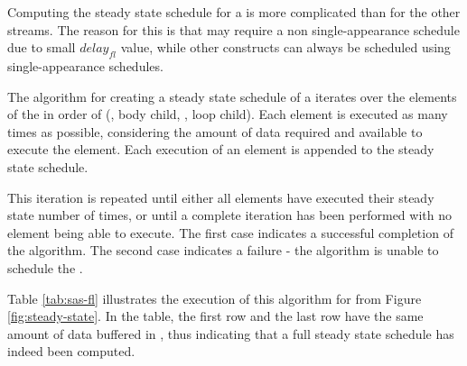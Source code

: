 \begin{comment}
\begin{displaymath}
\begin{array}{rl}
in^i_B = & l_j * u_j - l_B * o_{fl_B} \\
out^i_B = & u^i_{fl_B} + l_B * u_{fl_B} - l_s * o_s\\
in^i_L = & l_s * w_{s, 1} - l_L * o_{fl_L} \\
out^i_L = & delay_{fl} + u^i_{fl_L} + l_L * u_{fl_L} - l_j * w_{j,1} \\
\end{array}
\end{displaymath}
\end{comment}

 Computing the steady
state schedule for a {{\feedbackloop}} is more complicated than
for the other streams.  The reason for this is that
{{\feedbackloops}} may require a non single-appearance schedule
due to small $delay_{fl}$ value, while other {\StreamIt}
constructs can always be scheduled using single-appearance
schedules.

\begin{comment}
The algorithm used for creating of a steady state schedule
will work in several phases.  The amount of data present in
{{\Channels}} between the children of the {{\feedbackloop}}, the
{\joiner} and the {\splitter} is kept track of to determine which
element is allowed to execute.
\end{comment}

The algorithm for creating a steady state schedule of a
{{\feedbackloop}} iterates over the elements of the {{\feedbackloop}}
in order of ({\joiner}, body child, {\splitter}, loop child). Each
element is executed as many times as possible, considering the
amount of data required and available to execute the element. Each
execution of an element is appended to the steady state schedule.

This iteration is repeated until either all elements have executed
their steady state number of times, or until a complete iteration
has been performed with no element being able to execute. The
first case indicates a successful completion of the algorithm. The
second case indicates a failure - the algorithm is unable to
schedule the {{\feedbackloop}}.

Table \ref{tab:sas-fl} illustrates the execution of this algorithm
for {{\feedbackloop}} from Figure \ref{fig:steady-state}. In the
table, the first row and the last row have the same amount of data
buffered in {{\Channels}}, thus indicating that a full steady
state schedule has indeed been computed.
\begin{comment}
Furthermore, the last entry considering execution of $B$ has
sufficient data to execute $B$ 5 times, but only executes it 4
times to ensure that a steady state schedule is constructed.
\end{comment}

